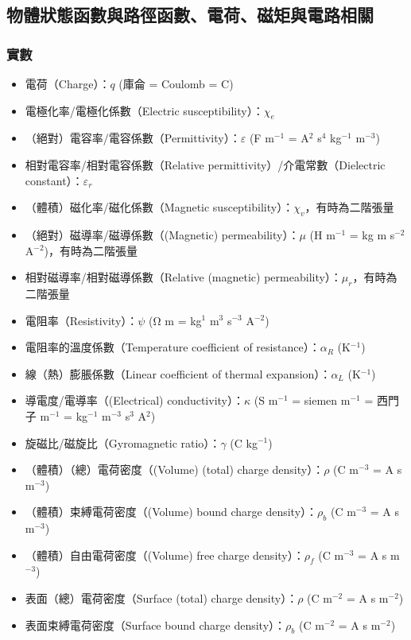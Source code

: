 \documentclass[a4paper,12pt]{report}
\begin{document}
\begin{itemize}
\subsection{物體狀態函數與路徑函數、電荷、磁矩與電路相關}
\subsubsection{實數}
\begin{itemize}
\item 電荷（Charge）：$q$ (庫侖 = Coulomb = C)
\item 電極化率/電極化係數（Electric susceptibility）：$\chi_e$
\item （絕對）電容率/電容係數（Permittivity）：$\varepsilon$ (F m$^{-1}$ = A$^2$ s$^4$ kg$^{-1}$ m$^{-3}$)
\item 相對電容率/相對電容係數（Relative permittivity）/介電常數（Dielectric constant）：$\varepsilon_r$
\item （體積）磁化率/磁化係數（Magnetic susceptibility）：$\chi_v$，有時為二階張量
\item （絕對）磁導率/磁導係數（(Magnetic) permeability）：$\mu$ (H m$^{-1}$ = kg m s$^{-2}$ A$^{-2}$)，有時為二階張量
\item 相對磁導率/相對磁導係數（Relative (magnetic) permeability）：$\mu_r$，有時為二階張量
\item 電阻率（Resistivity）：$\psi$ (Ω m = kg$^1$ m$^3$ s$^{-3}$ A$^{-2}$)
\item 電阻率的溫度係數（Temperature coefficient of resistance）：$\alpha_R$ (K$^{-1}$)
\item 線（熱）膨脹係數（Linear coefficient of thermal expansion）：$\alpha_L$ (K$^{-1}$)
\item 導電度/電導率（(Electrical) conductivity）：$\kappa$ (S m$^{-1}$ = siemen m$^{-1}$ = 西門子 m$^{-1}$ = kg$^{-1}$ m$^{-3}$ s$^3$ A$^2$)
\item 旋磁比/磁旋比（Gyromagnetic ratio）：$\gamma$ (C kg$^{-1}$)
\item （體積）（總）電荷密度（(Volume) (total) charge density）：$\rho$ (C m$^{-3}$ = A s m$^{-3}$)
\item （體積）束縛電荷密度（(Volume) bound charge density）：$\rho_b$ (C m$^{-3}$ = A s m$^{-3}$)
\item （體積）自由電荷密度（(Volume) free charge density）：$\rho_f$ (C m$^{-3}$ = A s m$^{-3}$)
\item 表面（總）電荷密度（Surface (total) charge density）：$\rho$ (C m$^{-2}$ = A s m$^{-2}$)
\item 表面束縛電荷密度（Surface bound charge density）：$\rho_b$ (C m$^{-2}$ = A s m$^{-2}$)

\end{itemize}
\end{itemize}
\end{document}
